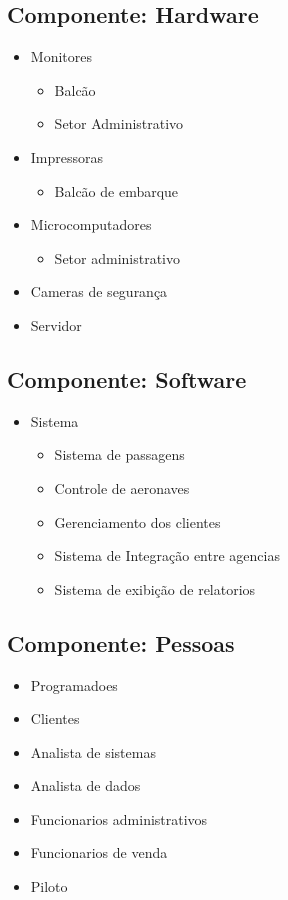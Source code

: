 \subsection{Componente: Hardware}
\begin{itemize}
       \item Monitores
             \begin{itemize}
                    \item Balcão
                    \item Setor Administrativo
             \end{itemize}
             
       \item Impressoras
             \begin{itemize}
                    \item Balcão de embarque
             \end{itemize}
       \item Microcomputadores
             \begin{itemize}
                    \item Setor administrativo
             \end{itemize}
       \item Cameras de segurança
       \item Servidor
\end{itemize}

\subsection{Componente: Software}
\begin{itemize}
       \item Sistema
             \begin{itemize}
                    \item Sistema de passagens
                    \item Controle de aeronaves
                    \item Gerenciamento dos clientes
                    \item Sistema de Integração entre agencias
                    \item Sistema de exibição de relatorios
             \end{itemize}
\end{itemize}



\subsection{Componente: Pessoas}
\begin{itemize}
       \item Programadoes
       \item Clientes
       \item Analista de sistemas
       \item Analista de dados
       \item Funcionarios administrativos
       \item Funcionarios de venda
       \item Piloto
\end{itemize}

